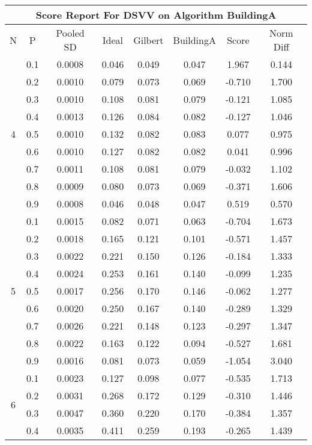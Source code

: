 \documentclass[11pt,a4paper]{report}
\begin{document}
\begin{longtable}{ | c | c || c | c | c | c | c | c | }
\hline
\multicolumn{8}{|c|}{ Score Report For DSVV on Algorithm BuildingA} \\
\hline
N & P & Pooled SD &  Ideal &  Gilbert & BuildingA  & Score & Norm Diff \\
 \hline
 \hline
 \endhead
\multirow{9}{*}{4} & 0.1 & 0.0008 & 0.046 & 0.049 & 0.047 & 1.967 & 0.144 \\
 & 0.2 & 0.0010 & 0.079 & 0.073 & 0.069 & -0.710 & 1.700 \\
 & 0.3 & 0.0010 & 0.108 & 0.081 & 0.079 & -0.121 & 1.085 \\
 & 0.4 & 0.0013 & 0.126 & 0.084 & 0.082 & -0.127 & 1.046 \\
 & 0.5 & 0.0010 & 0.132 & 0.082 & 0.083 & 0.077 & 0.975 \\
 & 0.6 & 0.0010 & 0.127 & 0.082 & 0.082 & 0.041 & 0.996 \\
 & 0.7 & 0.0011 & 0.108 & 0.081 & 0.079 & -0.032 & 1.102 \\
 & 0.8 & 0.0009 & 0.080 & 0.073 & 0.069 & -0.371 & 1.606 \\
 & 0.9 & 0.0008 & 0.046 & 0.048 & 0.047 & 0.519 & 0.570 \\
 \hline
\multirow{9}{*}{5} & 0.1 & 0.0015 & 0.082 & 0.071 & 0.063 & -0.704 & 1.673 \\
 & 0.2 & 0.0018 & 0.165 & 0.121 & 0.101 & -0.571 & 1.457 \\
 & 0.3 & 0.0022 & 0.221 & 0.150 & 0.126 & -0.184 & 1.333 \\
 & 0.4 & 0.0024 & 0.253 & 0.161 & 0.140 & -0.099 & 1.235 \\
 & 0.5 & 0.0017 & 0.256 & 0.170 & 0.146 & -0.062 & 1.277 \\
 & 0.6 & 0.0020 & 0.250 & 0.167 & 0.140 & -0.289 & 1.329 \\
 & 0.7 & 0.0026 & 0.221 & 0.148 & 0.123 & -0.297 & 1.347 \\
 & 0.8 & 0.0022 & 0.163 & 0.122 & 0.094 & -0.527 & 1.681 \\
 & 0.9 & 0.0016 & 0.081 & 0.073 & 0.059 & -1.054 & 3.040 \\
 \hline
\multirow{9}{*}{6} & 0.1 & 0.0023 & 0.127 & 0.098 & 0.077 & -0.535 & 1.713 \\
 & 0.2 & 0.0031 & 0.268 & 0.172 & 0.129 & -0.310 & 1.446 \\
 & 0.3 & 0.0047 & 0.360 & 0.220 & 0.170 & -0.384 & 1.357 \\
 & 0.4 & 0.0035 & 0.411 & 0.259 & 0.193 & -0.265 & 1.439 \\

\end{longtable}
\end{document}
